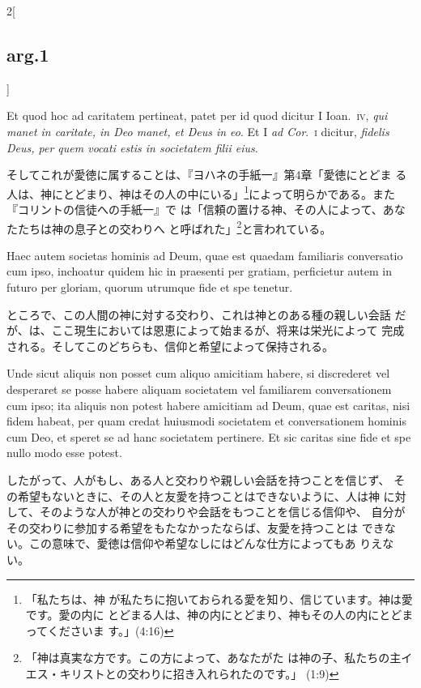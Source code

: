 \documentclass[paper=a4paper,fontsize=10pt,jafontsize=9pt,titlepage]{jlreq}
\begin{document}
\begin{paracol}{2}[\subsection{arg.1}]
\switchcolumn*

Et quod hoc ad caritatem pertineat, patet per id quod dicitur I
Ioan.~{\scshape iv}, {\itshape qui manet in caritate, in Deo manet, et
Deus in eo}. Et I {\itshape ad Cor}.~{\scshape i} dicitur, {\itshape
fidelis Deus, per quem vocati estis in societatem filii eius}.

\switchcolumn

そしてこれが愛徳に属することは、『ヨハネの手紙一』第4章「愛徳にとどま
 る人は、神にとどまり、神はその人の中にいる」\footnote{「私たちは、神
 が私たちに抱いておられる愛を知り、信じています。神は愛です。愛の内に
 とどまる人は、神の内にとどまり、神もその人の内にとどまってくださいま
 す。」(4:16)}によって明らかである。また『コリントの信徒への手紙一』で
 は「信頼の置ける神、その人によって、あなたたちは神の息子との交わりへ
 と呼ばれた」\footnote{「神は真実な方です。この方によって、あなたがた
 は神の子、私たちの主イエス・キリストとの交わりに招き入れられたのです。」
 (1:9)}と言われている。

\switchcolumn*

Haec autem societas hominis ad Deum, quae est quaedam familiaris
conversatio cum ipso, inchoatur quidem hic in praesenti per gratiam,
perficietur autem in futuro per gloriam, quorum utrumque fide et spe
tenetur.

\switchcolumn

ところで、この人間の神に対する交わり、これは神とのある種の親しい会話
 だが、は、ここ現生においては恩恵によって始まるが、将来は栄光によって
 完成される。そしてこのどちらも、信仰と希望によって保持される。

\switchcolumn*

Unde sicut aliquis non posset cum aliquo amicitiam habere, si
discrederet vel desperaret se posse habere aliquam societatem vel
familiarem conversationem cum ipso; ita aliquis non potest habere
amicitiam ad Deum, quae est caritas, nisi fidem habeat, per quam
credat huiusmodi societatem et conversationem hominis cum Deo, et
speret se ad hanc societatem pertinere. Et sic caritas sine fide et
spe nullo modo esse potest.

\switchcolumn

したがって、人がもし、ある人と交わりや親しい会話を持つことを信じず、
 その希望もないときに、その人と友愛を持つことはできないように、人は神
 に対して、そのような人が神との交わりや会話をもつことを信じる信仰や、
 自分がその交わりに参加する希望をもたなかったならば、友愛を持つことは
 できない。この意味で、愛徳は信仰や希望なしにはどんな仕方によってもあ
 りえない。


\end{paracol}
\end{document}
